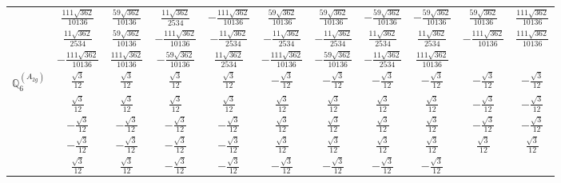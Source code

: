 \documentclass[fleqn,10pt,landscape]{article}
\begin{document}
\begin{itemize}
{\begin{center}
\begin{longtable}{ccccccccccc}
& $ \frac{111 \sqrt{362}}{10136} $ & $ \frac{59 \sqrt{362}}{10136} $ & $ \frac{11 \sqrt{362}}{2534} $ & $ - \frac{111 \sqrt{362}}{10136} $ & $ \frac{59 \sqrt{362}}{10136} $ & $ \frac{59 \sqrt{362}}{10136} $ & $ - \frac{59 \sqrt{362}}{10136} $ & $ - \frac{59 \sqrt{362}}{10136} $ & $ \frac{59 \sqrt{362}}{10136} $ & $ \frac{111 \sqrt{362}}{10136} $ \\
& $ \frac{11 \sqrt{362}}{2534} $ & $ \frac{59 \sqrt{362}}{10136} $ & $ - \frac{111 \sqrt{362}}{10136} $ & $ - \frac{11 \sqrt{362}}{2534} $ & $ - \frac{11 \sqrt{362}}{2534} $ & $ - \frac{11 \sqrt{362}}{2534} $ & $ \frac{11 \sqrt{362}}{2534} $ & $ \frac{11 \sqrt{362}}{2534} $ & $ - \frac{111 \sqrt{362}}{10136} $ & $ \frac{111 \sqrt{362}}{10136} $ \\
& $ - \frac{111 \sqrt{362}}{10136} $ & $ \frac{111 \sqrt{362}}{10136} $ & $ - \frac{59 \sqrt{362}}{10136} $ & $ \frac{11 \sqrt{362}}{2534} $ & $ - \frac{111 \sqrt{362}}{10136} $ & $ - \frac{59 \sqrt{362}}{10136} $ & $ - \frac{11 \sqrt{362}}{2534} $ & $ \frac{111 \sqrt{362}}{10136} $ & $  $ & $  $ \\ \hline
$\mathbb{Q}_{6}^{(A_{2g})}$ & $ \frac{\sqrt{3}}{12} $ & $ \frac{\sqrt{3}}{12} $ & $ \frac{\sqrt{3}}{12} $ & $ \frac{\sqrt{3}}{12} $ & $ - \frac{\sqrt{3}}{12} $ & $ - \frac{\sqrt{3}}{12} $ & $ - \frac{\sqrt{3}}{12} $ & $ - \frac{\sqrt{3}}{12} $ & $ - \frac{\sqrt{3}}{12} $ & $ - \frac{\sqrt{3}}{12} $ \\
& $ \frac{\sqrt{3}}{12} $ & $ \frac{\sqrt{3}}{12} $ & $ \frac{\sqrt{3}}{12} $ & $ \frac{\sqrt{3}}{12} $ & $ \frac{\sqrt{3}}{12} $ & $ \frac{\sqrt{3}}{12} $ & $ \frac{\sqrt{3}}{12} $ & $ \frac{\sqrt{3}}{12} $ & $ - \frac{\sqrt{3}}{12} $ & $ - \frac{\sqrt{3}}{12} $ \\
& $ - \frac{\sqrt{3}}{12} $ & $ - \frac{\sqrt{3}}{12} $ & $ - \frac{\sqrt{3}}{12} $ & $ - \frac{\sqrt{3}}{12} $ & $ \frac{\sqrt{3}}{12} $ & $ \frac{\sqrt{3}}{12} $ & $ \frac{\sqrt{3}}{12} $ & $ \frac{\sqrt{3}}{12} $ & $ - \frac{\sqrt{3}}{12} $ & $ - \frac{\sqrt{3}}{12} $ \\
& $ - \frac{\sqrt{3}}{12} $ & $ - \frac{\sqrt{3}}{12} $ & $ - \frac{\sqrt{3}}{12} $ & $ - \frac{\sqrt{3}}{12} $ & $ \frac{\sqrt{3}}{12} $ & $ \frac{\sqrt{3}}{12} $ & $ \frac{\sqrt{3}}{12} $ & $ \frac{\sqrt{3}}{12} $ & $ \frac{\sqrt{3}}{12} $ & $ \frac{\sqrt{3}}{12} $ \\
& $ \frac{\sqrt{3}}{12} $ & $ \frac{\sqrt{3}}{12} $ & $ - \frac{\sqrt{3}}{12} $ & $ - \frac{\sqrt{3}}{12} $ & $ - \frac{\sqrt{3}}{12} $ & $ - \frac{\sqrt{3}}{12} $ & $ - \frac{\sqrt{3}}{12} $ & $ - \frac{\sqrt{3}}{12} $ & $  $ & $  $ \\ \hline

\end{longtable}
\end{center}}
\end{itemize}
\end{document}
